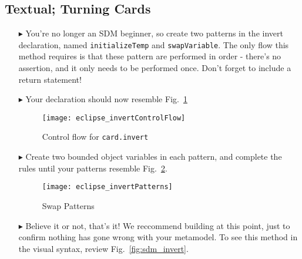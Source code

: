 \newpage
\subsection{Textual; Turning Cards}
\texHeader
\hypertarget{invertCard tex}{}

\begin{itemize}

\item[$\blacktriangleright$] You're no longer an SDM beginner, so create two patterns in the invert declaration, named \texttt{initializeTemp} and
\texttt{swapVariable}. The only flow this method requires is that these pattern are performed in order - there's no assertion, and it only needs to be
performed once. Don't forget to include a return statement!

\item[$\blacktriangleright$] Your declaration should now resemble Fig.~\ref{fig:eclipse_invert}

\begin{figure}[htbp]
\begin{center}
  \texttt{[image: eclipse\_invertControlFlow]}
  \caption{Control flow for \texttt{card.invert}}  
  \label{fig:eclipse_invert}
\end{center}
\end{figure}

\item[$\blacktriangleright$] Create two bounded object variables in each pattern, and complete the rules until your patterns resemble
Fig.~\ref{fig:invertPatterns}.

\begin{figure}[htbp]
\begin{center}
  \texttt{[image: eclipse\_invertPatterns]}
  \caption{Swap Patterns}  
  \label{fig:invertPatterns}
\end{center}
\end{figure}

\item[$\blacktriangleright$] Believe it or not, that's it! We reccommend building at this point, just to confirm nothing has gone wrong with your metamodel. To
see this method in the visual syntax, review Fig.~\ref{fig:sdm_invert}.

\end{itemize}